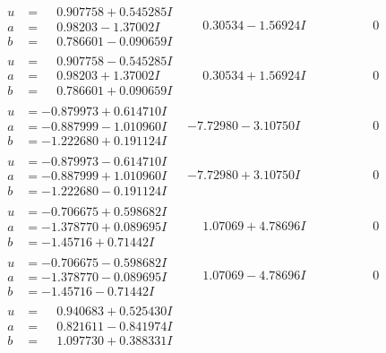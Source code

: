 \documentclass[1p]{elsarticle_modified}
\theoremstyle{definition}
\begin{document}
$$\begin{array}{c|c|c}
\begin{aligned}
u &= \phantom{-}0.907758 + 0.545285 I \\
a &= \phantom{-}0.98203 - 1.37002 I \\
b &= \phantom{-}0.786601 - 0.090659 I\end{aligned}
 & \phantom{-}0.30534 - 1.56924 I & \phantom{-0.000000 } 0 \\ \hline\begin{aligned}
u &= \phantom{-}0.907758 - 0.545285 I \\
a &= \phantom{-}0.98203 + 1.37002 I \\
b &= \phantom{-}0.786601 + 0.090659 I\end{aligned}
 & \phantom{-}0.30534 + 1.56924 I & \phantom{-0.000000 } 0 \\ \hline\begin{aligned}
u &= -0.879973 + 0.614710 I \\
a &= -0.887999 - 1.010960 I \\
b &= -1.222680 + 0.191124 I\end{aligned}
 & -7.72980 - 3.10750 I & \phantom{-0.000000 } 0 \\ \hline\begin{aligned}
u &= -0.879973 - 0.614710 I \\
a &= -0.887999 + 1.010960 I \\
b &= -1.222680 - 0.191124 I\end{aligned}
 & -7.72980 + 3.10750 I & \phantom{-0.000000 } 0 \\ \hline\begin{aligned}
u &= -0.706675 + 0.598682 I \\
a &= -1.378770 + 0.089695 I \\
b &= -1.45716 + 0.71442 I\end{aligned}
 & \phantom{-}1.07069 + 4.78696 I & \phantom{-0.000000 } 0 \\ \hline\begin{aligned}
u &= -0.706675 - 0.598682 I \\
a &= -1.378770 - 0.089695 I \\
b &= -1.45716 - 0.71442 I\end{aligned}
 & \phantom{-}1.07069 - 4.78696 I & \phantom{-0.000000 } 0 \\ \hline\begin{aligned}
u &= \phantom{-}0.940683 + 0.525430 I \\
a &= \phantom{-}0.821611 - 0.841974 I \\
b &= \phantom{-}1.097730 + 0.388331 I\end{aligned}

\end{array}$$
\end{document}
